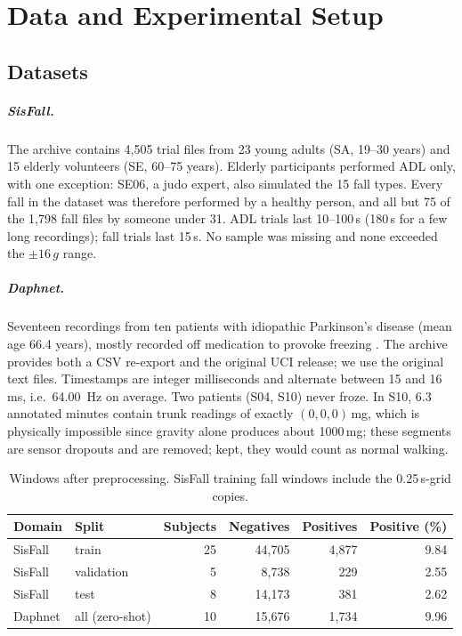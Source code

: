 \chapter{Data and Experimental Setup}
\label{ch:setup}

\section{Datasets}

\paragraph{SisFall.} The archive contains 4{,}505 trial files from 23 young adults (SA, 19--30 years)
and 15 elderly volunteers (SE, 60--75 years). Elderly participants performed ADL only, with one
exception: SE06, a judo expert, also simulated the 15 fall types. Every fall in the dataset was
therefore performed by a healthy person, and all but 75 of the 1{,}798 fall files by someone under
31. ADL trials last 10--100\,s (180\,s for a few long recordings); fall trials last 15\,s. No sample
was missing and none exceeded the $\pm16\,g$ range.

\paragraph{Daphnet.} Seventeen recordings from ten patients with idiopathic Parkinson's disease
(mean age 66.4 years), mostly recorded off medication to provoke freezing \parencite{bachlin2010daphnet}. The
archive provides both a CSV re-export and the original UCI release; we use the original text files.
Timestamps are integer milliseconds and alternate between 15 and 16\,ms, i.e.\ \SI{64.00}{\hertz} on
average. Two patients (S04, S10) never froze. In S10, 6.3 annotated minutes contain trunk readings of
exactly $(0,0,0)$\,mg, which is physically impossible since gravity alone produces about 1000\,mg;
these segments are sensor dropouts and are removed; kept, they would count as normal walking.

\begin{table}[ht]
\centering
\small
\caption{Windows after preprocessing. SisFall training fall windows include the 0.25\,s-grid copies.}
\label{tab:data}
\begin{tabular}{llrrrr}
\toprule
Domain & Split & Subjects & Negatives & Positives & Positive (\%) \\
\midrule
SisFall & train & 25 & 44{,}705 & 4{,}877 & 9.84 \\
SisFall & validation & 5 & 8{,}738 & 229 & 2.55 \\
SisFall & test & 8 & 14{,}173 & 381 & 2.62 \\
Daphnet & all (zero-shot) & 10 & 15{,}676 & 1{,}734 & 9.96 \\
\bottomrule
\end{tabular}
\end{table}

